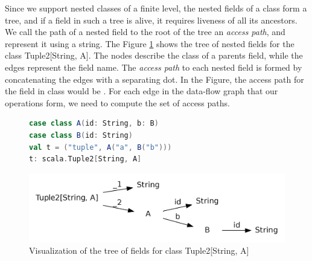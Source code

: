 Since we support nested classes of a finite level, the nested fields of a class
form a tree, and if a field in such a tree is alive, it requires liveness of all
its ancestors. We call the path of a nested field to the root of the tree an
\emph{access path}, and represent it using a string. The Figure
\ref{fig:type_tree} shows the tree of nested fields for the class Tuple2[String,
A]. The nodes describe the class of a parents field, while the edges represent
the field name. The \emph{access path} to each nested field is formed by
concatenating the edges with a separating dot. In the Figure, the access path
for the field  in class  would be . For each edge
in the data-flow graph that our operations form, we need to compute the set of
access paths.

\begin{figure}[b]
\begin{lstlisting}[language=Scala,name=code]
case class A(id: String, b: B)
case class B(id: String)  
val t = ("tuple", A("a", B("b"))) 
t: scala.Tuple2[String, A]
\end{lstlisting}
\centering
\includegraphics[clip=true, width=0.95\columnwidth]{dot/access.png}
\caption{Visualization of the tree of fields for class Tuple2[String, A]}
\label{fig:type_tree}
\end{figure}

